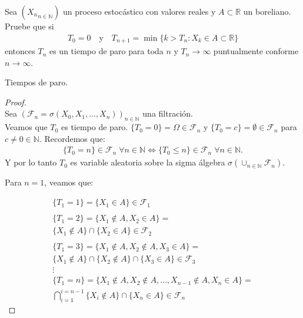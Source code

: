 \begin{problema}
	Sea $\left({X_n}_{n\in\mathbb{N}}\right)$ un proceso estocástico con valores reales y $A\subset \mathbb{R}$ un boreliano. 
	Pruebe que si
	\begin{align}
		T_0=0\quad\text{y}\quad T_{n+1}=\min\{k>T_n: X_k\in A \subset \mathbb{R}\}
	\end{align}
	entonces $T_n$ es un tiempo de paro para toda $n$ y $T_n\to \infty$ puntualmente conforme $n\to\infty$. 

	\begin{categoria} 
		Tiempos de paro.
	\end{categoria}
\end{problema}
		
\begin{proof}
\\

	Sea $(\mathscr{F}_n = \sigma(  X_0, X_1, \dots, X_n ))_{ n \in \mathbb{N}}$ una filtración.
\\

	Veamos que $T_0$ es tiempo de paro. $\{T_0 = 0\} = \Omega \in \mathscr{F}_n$ y 
	$\{T_0 = c\} = \emptyset \in \mathscr{F}_n$ para $c \not= 0 \in \mathbb{N}$. Recordemos que:		
	\begin{align}\label{problema_1_1:equivalencia_varable_aleatoria}
		\{T_0 = n\} \in \mathscr{F}_n \; \forall n \in \mathbb{N} \iff 
		\{T_0 \leq n\} \in \mathscr{F}_n \; \forall n \in \mathbb{N}.
	\end{align}
	Y por lo tanto $T_0$ es variable aleatoria sobre la sigma álgebra $\sigma(\cup_{n \in \mathbb{N}} 
	\mathscr{F}_n)$.

	Para $n=1$, veamos que:
 
	\begin{align}
			\{T_1 = 1\} = \{ X_1 \in A \} 
			\in \mathscr{F}_1 
		\\	\\
			\{T_1 = 2\} = \{ X_1 \not\in A, X_2 \in A \} = \\ 
			\{ X_1 \not\in A \} \cap \{X_2 \in A \}  
			\in \mathscr{F}_2	
		\\ \\
			\{T_1 = 3\} = 
			\{ X_1 \not\in A, X_2 \not\in A,  X_3 \in A \} = \\
			\{ X_1 \not\in A \} \cap \{ X_2 \not\in A \} \cap \{X_3 \in A \} 
			\in \mathscr{F}_3
		\\
			\vdots
		\\
			\{T_1 = n\} = 
			\{ X_1 \not\in A, X_2 \not\in A, \dots, X_{n-1} \not\in A, X_n \in A \} = \\
			\bigcap_{i=1}^{i=n-1} \{ X_i \not\in A \} \cap \{X_n \in A \} 
			\in \mathscr{F}_n
	\end{align} 
 

\end{proof}
